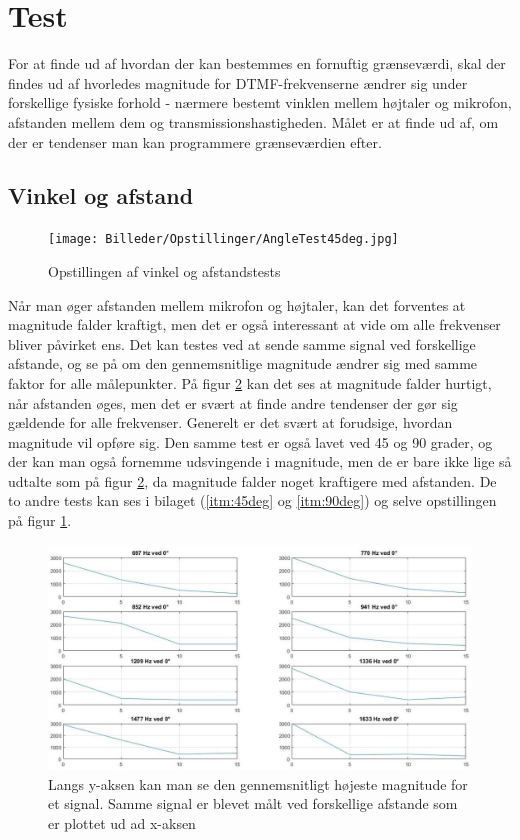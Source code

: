 \section{Test}

For at finde ud af hvordan der kan bestemmes en fornuftig grænseværdi, skal der findes ud af hvorledes magnitude for DTMF-frekvenserne ændrer sig under forskellige fysiske forhold - nærmere bestemt vinklen mellem højtaler og mikrofon, afstanden mellem dem og transmissionshastigheden. Målet er at finde ud af, om der er tendenser man kan programmere grænseværdien efter. 

\subsection{Vinkel og afstand} \label{sec:afstand}

\begin{figure}[h!]
\centering
\texttt{[image: Billeder/Opstillinger/AngleTest45deg.jpg]}
\caption{Opstillingen af vinkel og afstandstests}
\label{fig:opstilling}
\end{figure} 

Når man øger afstanden mellem mikrofon og højtaler, kan det forventes at magnitude falder kraftigt, men det er også interessant at vide om alle frekvenser bliver påvirket ens. Det kan testes ved at sende samme signal ved forskellige afstande, og se på om den gennemsnitlige magnitude ændrer sig med samme faktor for alle målepunkter. På figur \ref{fig:degrees} kan det ses at magnitude falder hurtigt, når afstanden øges, men det er svært at finde andre tendenser der gør sig gældende for alle frekvenser. Generelt er det svært at forudsige, hvordan magnitude vil opføre sig. Den samme test er også lavet ved 45 og 90 grader, og der kan man også fornemme udsvingende i magnitude, men de er bare ikke lige så udtalte som på figur \ref{fig:degrees}, da magnitude falder noget kraftigere med afstanden. De to andre tests kan ses i bilaget (\ref{itm:45deg} og \ref{itm:90deg}) og selve opstillingen på figur \ref{fig:opstilling}.

\begin{figure}[h!]
\centering
\includegraphics[scale=0.5]{Billeder/0degrees.jpg}
\caption{Langs y-aksen kan man se den gennemsnitligt højeste magnitude for et signal. Samme signal er blevet målt ved forskellige afstande som er plottet ud ad x-aksen}
\label{fig:degrees}
\end{figure} 

